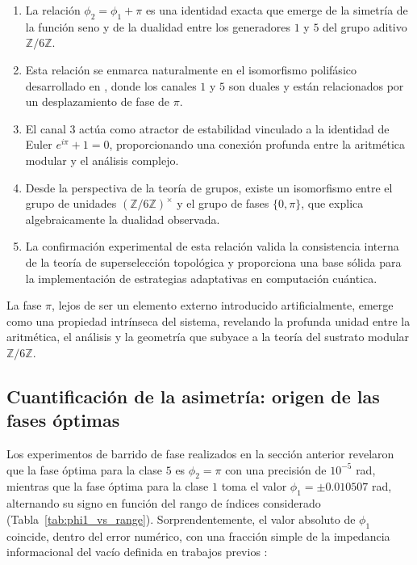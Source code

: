 \documentclass[12pt,a4paper]{article}
\theoremstyle{plain}
\theoremstyle{definition}
\theoremstyle{remark}
\begin{document}
\begin{enumerate}
\item La relación $\phi_2 = \phi_1 + \pi$ es una identidad exacta que emerge de la simetría de la función seno y de la dualidad entre los generadores $1$ y $5$ del grupo aditivo $\mathbb{Z}/6\mathbb{Z}$.

\item Esta relación se enmarca naturalmente en el isomorfismo polifásico desarrollado en \cite{PeinadorDSP}, donde los canales $1$ y $5$ son duales y están relacionados por un desplazamiento de fase de $\pi$.

\item El canal $3$ actúa como atractor de estabilidad vinculado a la identidad de Euler $e^{i\pi} + 1 = 0$, proporcionando una conexión profunda entre la aritmética modular y el análisis complejo.

\item Desde la perspectiva de la teoría de grupos, existe un isomorfismo entre el grupo de unidades $(\mathbb{Z}/6\mathbb{Z})^{\times}$ y el grupo de fases $\{0,\pi\}$, que explica algebraicamente la dualidad observada.

\item La confirmación experimental de esta relación valida la consistencia interna de la teoría de superselección topológica y proporciona una base sólida para la implementación de estrategias adaptativas en computación cuántica.

\end{enumerate}

La fase $\pi$, lejos de ser un elemento externo introducido artificialmente, emerge como una propiedad intrínseca del sistema, revelando la profunda unidad entre la aritmética, el análisis y la geometría que subyace a la teoría del sustrato modular $\mathbb{Z}/6\mathbb{Z}$.

\subsection*{Cuantificación de la asimetría: origen de las fases óptimas}

Los experimentos de barrido de fase realizados en la sección anterior revelaron que la fase óptima para la clase $5$ es $\phi_2 = \pi$ con una precisión de $10^{-5}$ rad, mientras que la fase óptima para la clase $1$ toma el valor $\phi_1 = \pm 0.010507$ rad, alternando su signo en función del rango de índices considerado (Tabla~\ref{tab:phi1_vs_range}). Sorprendentemente, el valor absoluto de $\phi_1$ coincide, dentro del error numérico, con una fracción simple de la impedancia informacional del vacío definida en trabajos previos \cite{PeinadorGenesis}:
\end{document}

